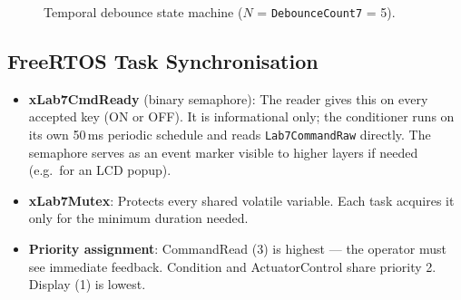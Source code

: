 \documentclass[12pt]{article}
\begin{document}
\begin{figure}[H]
\centering
{}
\caption{Temporal debounce state machine ($N$ = \texttt{DebounceCount7} = 5).}
\label{fig:fsm}
\end{figure}

\subsection{FreeRTOS Task Synchronisation}

\begin{itemize}
  \item \textbf{xLab7CmdReady} (binary semaphore): The reader gives this on every accepted key (ON or OFF). It is informational only; the conditioner runs on its own 50\,ms periodic schedule and reads \texttt{Lab7CommandRaw} directly. The semaphore serves as an event marker visible to higher layers if needed (e.g.\ for an LCD popup).
  \item \textbf{xLab7Mutex}: Protects every shared volatile variable. Each task acquires it only for the minimum duration needed.
  \item \textbf{Priority assignment}: CommandRead (3) is highest --- the operator must see immediate feedback. Condition and ActuatorControl share priority 2. Display (1) is lowest.
\end{itemize}
\end{document}
